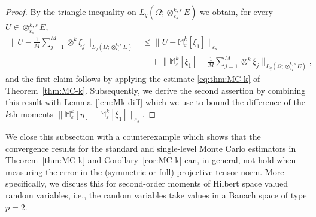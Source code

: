 \documentclass[reqno]{amsart}
\numberwithin{equation}{section}
\newcommand{\bbM}{\mathbb{M}}
\newcommand{\xk}{\otimes^k}
\newcommand{\xkseps}{\otimes^{k,s}_{\varepsilon_s}}
\newcommand{\tenvec}{U}
\newcommand{\Mk}{\bbM^k_\varepsilon}
\newcommand{\eps}{\varepsilon}
\theoremstyle{remark}
\theoremstyle{definition}
\begin{document}
\begin{proof} 
	By the triangle inequality on 	
	$L_q(\Omega;\xkseps E)$ we obtain,  
	for every $\tenvec\in\xkseps E$, 
	\begin{align*}
	\biggl\| 
	\tenvec -
	\frac{1}{M} 
	\sum_{j=1}^M 
	\xk \xi_j 
	\biggr\|_{L_q(\Omega;\xkseps E)} 
	&\leq 
	\bigl\| \tenvec - \Mk[\xi_1] \bigr\|_{\eps_s} 
	\\
	&\quad +
	\biggl\| 
	\Mk[\xi_1] 
	-
	\frac{1}{M} 
	\sum_{j=1}^M 
	\xk \xi_j 
	\biggr\|_{L_q(\Omega;\xkseps E)} , 
	\end{align*} 
	and the first claim follows 
	by applying the estimate \eqref{eq:thm:MC-k} 
	of Theorem~\ref{thm:MC-k}. 
	Subsequently, we derive the second assertion 
	by combining this result with Lemma~\ref{lem:Mk-diff}
	which we use to bound  
	the difference of the $k$th moments 
	$\bigl\| \Mk[\eta] - \Mk[\xi_1] \bigr\|_{\eps_s}$. 
\end{proof} 

We close this subsection with a counterexample 
which shows that the convergence results for the standard  
and single-level Monte Carlo estimators in 
Theorem~\ref{thm:MC-k} and Corollary~\ref{cor:MC-k}
can, in general, not hold when measuring the error 
in the (symmetric or full) projective tensor norm. 
More specifically, we discuss 
this for 
second-order moments 
of Hilbert space valued random variables, i.e., 
the random variables take values in a Banach space 
of type $p=2$. 
\end{document}
